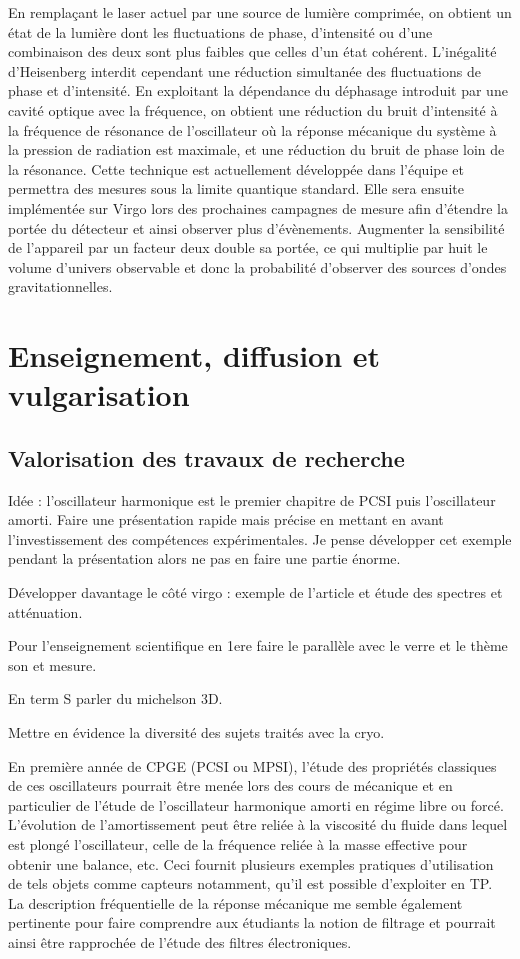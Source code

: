 \documentclass[12pt,a4paper]{article}
\begin{document}
En remplaçant le laser actuel par une source de lumière comprimée, on obtient un état de la lumière dont les fluctuations de phase, d'intensité ou d'une combinaison des deux sont plus faibles que celles d'un état cohérent.
L'inégalité d'Heisenberg interdit cependant une réduction simultanée des fluctuations de phase et d'intensité.
En exploitant la dépendance du déphasage introduit par une cavité optique avec la fréquence, on obtient une réduction du bruit d'intensité à la fréquence de résonance de l'oscillateur où la réponse mécanique du système à la pression de radiation est maximale,  et une réduction du bruit de phase loin de la résonance.
Cette technique est actuellement développée dans l'équipe et permettra des mesures sous la limite quantique standard.
Elle sera ensuite implémentée sur Virgo lors des prochaines campagnes de mesure afin d'étendre la portée du détecteur et ainsi observer plus d'évènements.
Augmenter la sensibilité de l'appareil par un facteur deux double sa portée, ce qui multiplie par huit le volume d'univers observable et donc la probabilité d'observer des sources d'ondes gravitationnelles.

\section{Enseignement, diffusion et vulgarisation}

\subsection{Valorisation des travaux de recherche}

Idée : l'oscillateur harmonique est le premier chapitre de PCSI puis l'oscillateur amorti.
Faire une présentation rapide mais précise en mettant en avant l'investissement des compétences expérimentales.
Je pense développer cet exemple pendant la présentation alors ne pas en faire une partie énorme.

Développer davantage le côté virgo : exemple de l'article et étude des spectres et atténuation.

Pour l'enseignement scientifique en 1ere faire le parallèle avec le verre et le thème son et mesure.

En term S parler du michelson 3D.

Mettre en évidence la diversité des sujets traités avec la cryo.

En première année de CPGE (PCSI ou MPSI), l'étude des propriétés classiques de ces oscillateurs pourrait être menée lors des cours de mécanique et en particulier de l'étude de l'oscillateur harmonique amorti en régime libre ou forcé.
L'évolution de l'amortissement peut être reliée à la viscosité du fluide dans lequel est plongé l'oscillateur, celle de la fréquence reliée à la masse effective pour obtenir une balance, etc.
Ceci fournit plusieurs exemples pratiques d'utilisation de tels objets comme capteurs notamment, qu'il est possible d'exploiter en TP.
La description fréquentielle de la réponse mécanique me semble également pertinente pour faire comprendre aux étudiants la notion de filtrage et pourrait ainsi être rapprochée de l'étude des filtres électroniques.
\end{document}
